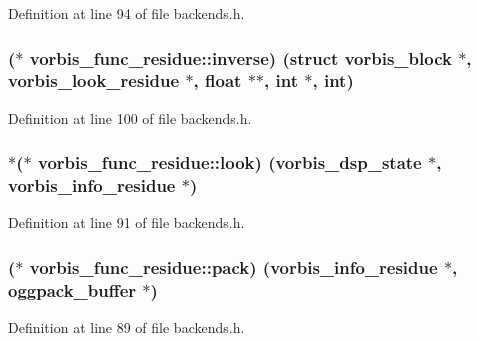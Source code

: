 Definition at line 94 of file backends.\+h.

\subsubsection[{\texorpdfstring{inverse}{inverse}}]{($\ast$ vorbis\+\_\+func\+\_\+residue\+::inverse) (struct {\bf vorbis\+\_\+block} $\ast$, {\bf vorbis\+\_\+look\+\_\+residue} $\ast$, float $\ast$$\ast$, {\bf int} $\ast$, {\bf int})}\hypertarget{structvorbis__func__residue_ada986573744a0aa244361bfde8410fd0}{}\label{structvorbis__func__residue_ada986573744a0aa244361bfde8410fd0}


Definition at line 100 of file backends.\+h.

\subsubsection[{\texorpdfstring{look}{look}}]{$\ast$($\ast$ vorbis\+\_\+func\+\_\+residue\+::look) ({\bf vorbis\+\_\+dsp\+\_\+state} $\ast$, {\bf vorbis\+\_\+info\+\_\+residue} $\ast$)}\hypertarget{structvorbis__func__residue_a0c5baa9f2dfe51c327d3a1f8f2c5872e}{}\label{structvorbis__func__residue_a0c5baa9f2dfe51c327d3a1f8f2c5872e}


Definition at line 91 of file backends.\+h.

\subsubsection[{\texorpdfstring{pack}{pack}}]{($\ast$ vorbis\+\_\+func\+\_\+residue\+::pack) ({\bf vorbis\+\_\+info\+\_\+residue} $\ast$, {\bf oggpack\+\_\+buffer} $\ast$)}\hypertarget{structvorbis__func__residue_a8f24c0275133d9e996c3f63f980cb1c8}{}\label{structvorbis__func__residue_a8f24c0275133d9e996c3f63f980cb1c8}


Definition at line 89 of file backends.\+h.


